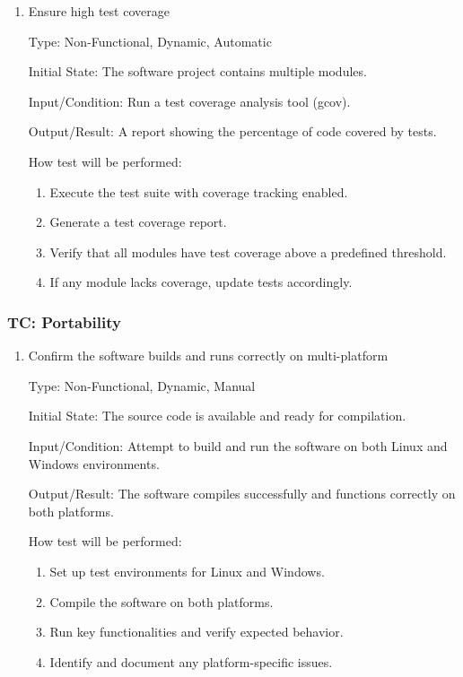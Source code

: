 \documentclass[12pt, titlepage]{article}
\begin{document}
\begin{enumerate}

  \item{Ensure high test coverage \\}

  Type: Non-Functional, Dynamic, Automatic

  Initial State: The software project contains multiple modules.

  Input/Condition: Run a test coverage analysis tool (gcov).

  Output/Result: A report showing the percentage of code covered by tests.

  How test will be performed:
  \begin{enumerate}
    \item Execute the test suite with coverage tracking enabled.
    \item Generate a test coverage report.
    \item Verify that all modules have test coverage above a predefined
    threshold.
    \item If any module lacks coverage, update tests accordingly.
  \end{enumerate}
\end{enumerate}

 \label{TC_PORTABILITY}
\subsubsection{TC\thetestcasenum : Portability}

\begin{enumerate}

  \item{Confirm the software builds and runs correctly on multi-platform \\}

  Type: Non-Functional, Dynamic, Manual

  Initial State: The source code is available and ready for compilation.

  Input/Condition: Attempt to build and run the software on both Linux and
  Windows environments.

  Output/Result: The software compiles successfully and functions correctly on
  both platforms.

  How test will be performed:
  \begin{enumerate}
    \item Set up test environments for Linux and Windows.
    \item Compile the software on both platforms.
    \item Run key functionalities and verify expected behavior.
    \item Identify and document any platform-specific issues.
  \end{enumerate}
\end{enumerate}
\end{document}
